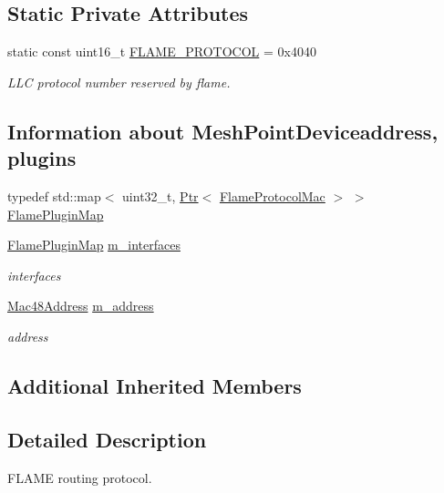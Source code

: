 \subsection*{Static Private Attributes}
\begin{DoxyCompactItemize}
\item 
static const uint16\+\_\+t \hyperlink{classns3_1_1flame_1_1FlameProtocol_a3d4799f4e6ee746e8e47cae132330c76}{F\+L\+A\+M\+E\+\_\+\+P\+R\+O\+T\+O\+C\+OL} = 0x4040
\begin{DoxyCompactList}\small\item\em L\+LC protocol number reserved by flame. \end{DoxyCompactList}\end{DoxyCompactItemize}
\subsection*{Information about Mesh\+Point\+Deviceaddress, plugins}
\begin{DoxyCompactItemize}
\item 
typedef std\+::map$<$ uint32\+\_\+t, \hyperlink{classns3_1_1Ptr}{Ptr}$<$ \hyperlink{classns3_1_1flame_1_1FlameProtocolMac}{Flame\+Protocol\+Mac} $>$ $>$ \hyperlink{classns3_1_1flame_1_1FlameProtocol_a51fc5b19ce20df8737998dec8c36931a}{Flame\+Plugin\+Map}
\item 
\hyperlink{classns3_1_1flame_1_1FlameProtocol_a51fc5b19ce20df8737998dec8c36931a}{Flame\+Plugin\+Map} \hyperlink{classns3_1_1flame_1_1FlameProtocol_ad8595153b7695efc169354d570625d24}{m\+\_\+interfaces}
\begin{DoxyCompactList}\small\item\em interfaces \end{DoxyCompactList}\item 
\hyperlink{classns3_1_1Mac48Address}{Mac48\+Address} \hyperlink{classns3_1_1flame_1_1FlameProtocol_aa14edf4450c8657c9e42dde32bc82df6}{m\+\_\+address}
\begin{DoxyCompactList}\small\item\em address \end{DoxyCompactList}\end{DoxyCompactItemize}
\subsection*{Additional Inherited Members}


\subsection{Detailed Description}
F\+L\+A\+ME routing protocol. 

